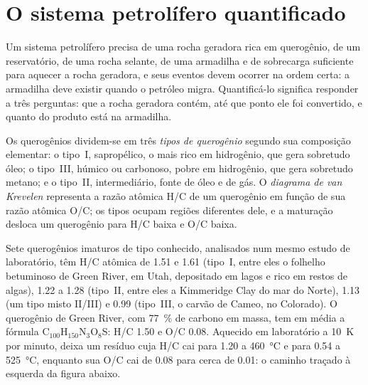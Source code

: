 \section{O sistema petrolífero quantificado}\label{sec:b2:energy-geology:petroleum}

Um sistema petrolífero precisa de uma rocha geradora rica em querogênio, de um reservatório, de uma rocha selante, de uma armadilha e de
sobrecarga suficiente para aquecer a rocha geradora, e seus eventos devem ocorrer na ordem certa: a armadilha deve
existir quando o petróleo migra. Quantificá-lo significa responder a três perguntas: que 
a rocha geradora contém, até que ponto ele foi convertido, e quanto do produto está na
armadilha.

\begin{definition}\label{def:b2:energy-geology:kerogen}
Os querogênios dividem-se em três \emph{tipos de querogênio} segundo sua composição elementar:
o tipo~I, sapropélico, o mais rico em hidrogênio, que gera sobretudo óleo; o tipo~III, húmico ou carbonoso,
pobre em hidrogênio, que gera sobretudo metano; e o tipo~II, intermediário, fonte de óleo
e de gás. O \emph{diagrama de van Krevelen} representa a razão atômica H/C de
um querogênio em função de sua razão atômica O/C; os tipos ocupam regiões diferentes dele, e a maturação
desloca um querogênio para H/C baixa e O/C baixa.
\end{definition}

Sete querogênios imaturos de tipo conhecido, analisados num mesmo estudo de laboratório, têm H/C atômica de
1.51 e 1.61 (tipo~I, entre eles o folhelho betuminoso de Green River, em Utah, depositado em lagos e rico em
restos de algas), 1.22 a 1.28 (tipo~II, entre eles a Kimmeridge Clay do mar do Norte),
1.13 (um tipo misto II/III) e 0.99 (tipo~III, o carvão de Cameo, no Colorado). O querogênio de Green
River, com \qty{77}{\percent} de carbono em massa, tem em média a fórmula C$_{100}$H$_{150}$N$_3$O$_8$S: H/C 1.50 e
O/C 0.08. Aquecido em laboratório a \qty{10}{K} por minuto, deixa um resíduo cuja H/C cai para
1.20 a \qty{460}{\celsius} e para 0.54 a \qty{525}{\celsius}, enquanto sua O/C cai de 0.08 para cerca de
0.01: o caminho traçado à esquerda da figura abaixo.

